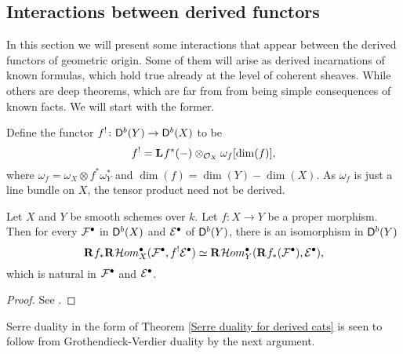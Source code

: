 \subsection{Interactions between derived functors}
\label{Subsection: Interactions between derived functors}

In this section we will present some interactions that appear between the derived functors of geometric origin. Some of them will arise as derived incarnations of known formulas, which hold true already at the level of coherent sheaves. While others are deep theorems, which are far from from being simple consequences of known facts. We will start with the former.


Define the functor $f^! \colon \mathsf{D}^b(Y) \to \mathsf{D}^b(X)$ to be
\[
    f^! = \mathbf{L}^{}f^*(-) \otimes_{{\mathcal{O}_{X}}} \omega_f[\dim(f)],
\]
where $\omega_f = \omega_X \otimes f^*\omega_Y^*$ and $\dim(f) = \dim(Y) - \dim(X)$. As $\omega_f$ is just a line bundle on $X$, the tensor product need not be derived. 

\begin{theorem}
    \label{Grothendieck-Verdier duality}
    Let $X$ and $Y$ be smooth schemes over $k$. Let $f \colon X \to Y$ be a proper morphism. Then for every $\mathcal F^\bullet$ in $\mathsf{D}^b(X)$ and $\mathcal E^\bullet$ of $\mathsf{D}^b(Y)$, there is an isomorphism in $\mathsf{D}^b(Y)$
    \[
        \rderived{}{f_*}\rderived{}{\localhom^\bullet_X}(\F^\bullet, f^! \E^\bullet) \iso \rderived{}{\localhom^\bullet_Y}(\rderived{}{f_*}(\F^\bullet), \E^\bullet),
    \]
    which is natural in $\mathcal F^\bullet$ and $\mathcal E^\bullet$.
\end{theorem}

\begin{proof}
    See \cite[Chapter VII, \S 4, Corollary 4.3]{Hartshorne1966}.
\end{proof}

\begin{remark}
    Serre duality in the form of Theorem \ref{Serre duality for derived cats} is seen to follow from Grothendieck-Verdier duality by the next argument.
\end{remark}
